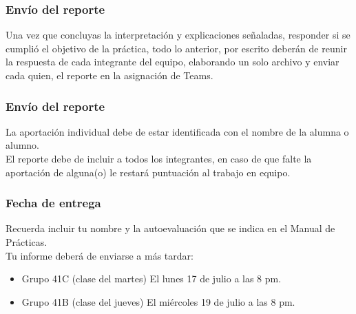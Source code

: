 \documentclass[14pt]{beamer}
\begin{document}
\begin{frame}
\frametitle{Envío del reporte}
Una vez que concluyas la interpretación y explicaciones señaladas, responder si se cumplió el objetivo de la práctica, todo lo anterior, por escrito \pause deberán de reunir la respuesta de cada integrante del equipo, elaborando un solo archivo y enviar cada quien, el reporte en la asignación de Teams.
\end{frame}
\begin{frame}
\frametitle{Envío del reporte}
La aportación individual debe de estar identificada con el nombre de la alumna o alumno.
\\
\bigskip
\pause
El reporte debe de incluir a todos los integrantes, en caso de que falte la aportación de alguna(o) le restará puntuación al trabajo en equipo.
\end{frame}
\begin{frame}
\frametitle{Fecha de entrega}
Recuerda incluir tu nombre y la autoevaluación que se indica en el Manual de Prácticas.
\\
\bigskip
\pause
Tu informe deberá de enviarse a más tardar:
\begin{itemize}
\item Grupo 41C (clase del martes) El lunes 17 de julio a las 8 pm.
\item Grupo 41B (clase del jueves) El miércoles 19 de julio a las 8 pm.
\end{itemize}
\end{frame}
\end{document}
